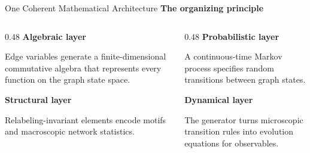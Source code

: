 \documentclass[11pt]{beamer}
\newcommand{\eyebrow}[1]{%
  {\color{accent}\bfseries #1}\par
  \vspace{0.04cm}{\color{lightgray}\rule{\linewidth}{0.45pt}}\vspace{0.10cm}}
\newcommand{\keyterm}[1]{\textcolor{accent}{\bfseries #1}}
\begin{document}
\begin{frame}{One Coherent Mathematical Architecture}
  \small
  \eyebrow{The organizing principle}

  \begin{center}
  \end{center}

  \vspace{0.55cm}
  \begin{columns}[T,onlytextwidth]
    \begin{column}{0.48\textwidth}
      \keyterm{Algebraic layer}\par
      Edge variables generate a finite-dimensional commutative algebra that represents every function on the graph state 
      space.

      \vspace{0.35cm}
      \keyterm{Structural layer}\par
      Relabeling-invariant elements encode motifs and macroscopic network statistics.
    \end{column}
    \begin{column}{0.48\textwidth}
      \keyterm{Probabilistic layer}\par
      A continuous-time Markov process specifies random transitions between graph states.

      \vspace{0.35cm}
      \keyterm{Dynamical layer}\par
      The generator turns microscopic transition rules into evolution equations for observables.
    \end{column}
  \end{columns}
\end{frame}
\end{document}
